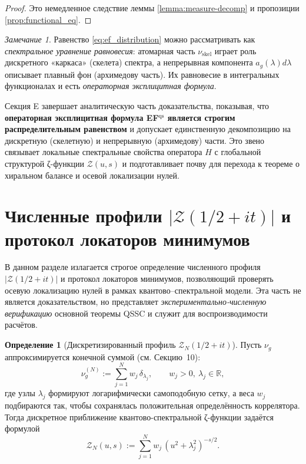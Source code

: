 \documentclass{article}
\numberwithin{equation}{section}
\theoremstyle{plain}
\theoremstyle{definition}
\newtheorem{definition}{Определение}
\theoremstyle{remark}
\newtheorem*{remark}{Замечание}
\def\delta{δ}\def\Delta{Δ}\def\epsilon{ε}\def\zeta{ζ}%
\begin{document}
\begin{proof}
Это немедленное следствие леммы \ref{lemma:measure-decomp} и пропозиции \ref{prop:functional_eq}.
\end{proof}

\begin{remark}
Равенство \eqref{eq:ef_distribution} можно рассматривать как \emph{спектральное уравнение равновесия}:
атомарная часть $\nu_{\mathrm{skel}}$ играет роль дискретного «каркаса» (скелета) спектра,
а непрерывная компонента $a_g(\lambda)d\lambda$ описывает плавный фон (архимедову часть).
Их равновесие в интегральных функционалах и есть \emph{операторная эксплицитная формула}.
\end{remark}


\noindent
Секция E завершает аналитическую часть доказательства, показывая,
что \textbf{операторная эксплицитная формула EF$^{\mathrm{qs}}$ является строгим распределительным равенством}
и допускает единственную декомпозицию на дискретную (скелетную) и непрерывную (архимедову) части.
Это звено связывает локальные спектральные свойства оператора $H$
с глобальной структурой ζ-функции $\mathcal Z(u,s)$ и подготавливает почву
для перехода к теореме о хиральном балансе и осевой локализации нулей.

\clearpage

\section{Численные профили $|\mathcal Z(1/2+it)|$ и протокол локаторов минимумов}

\noindent
В данном разделе излагается строгое определение численного профиля 
\(|\mathcal Z(1/2+it)|\)
и протокол локаторов минимумов, позволяющий проверять осевую локализацию нулей
в рамках квантово–спектральной модели.  
Эта часть не является доказательством, но представляет \emph{экспериментально-численную верификацию}
основной теоремы QSSC и служит для воспроизводимости расчётов.

\begin{definition}[Дискретизированный профиль $\mathcal Z_N(1/2+it)$]
\label{def:Znum}
Пусть $\nu_g$ аппроксимируется конечной суммой (см. Секцию~10):
\begin{equation}
\nu_g^{(N)} := \sum_{j=1}^{N} w_j\,\delta_{\lambda_j},
\qquad w_j>0,\ \lambda_j\in\mathbb R,
\end{equation}
где узлы $\lambda_j$ формируют логарифмически самоподобную сетку, 
а веса $w_j$ подбираются так, чтобы сохранялась положительная определённость коррелятора.
Тогда дискретное приближение квантово-спектральной ζ-функции задаётся формулой
\begin{equation}
\label{eq:Znum}
\mathcal Z_N(u,s)
:=\sum_{j=1}^{N} w_j\,(u^2+\lambda_j^2)^{-s/2}.
\end{equation}
\end{definition}
\end{document}
